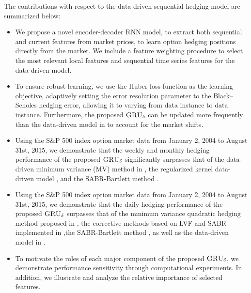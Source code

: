 \documentclass[letterpaper,12pt,titlepage,oneside,final]{book}
\numberwithin{equation}{section}
\theoremstyle{definition}
\newcommand{\model}{\textsc{GRU}_\delta}
\begin{document}
The contributions with respect to the data-driven sequential hedging model \cite{knian2019} are summarized below:
\begin{itemize}
	\item  We propose a novel encoder-decoder  RNN model, to extract both sequential and current features from market prices, to learn option hedging positions directly from the market. We include a feature weighting procedure to select the most relevant local features and sequential time series features for the data-driven model.
	\item To ensure robust learning, we use the Huber loss function as the learning objective,  adaptively setting the error resolution parameter to the Black–Scholes hedging error, allowing it to varying from data instance to data instance. Furthermore,    the proposed $\model$ can be updated more frequently than the data-driven model in \cite{knian2017} to account for the market shifts.
	\item Using the S\&P 500 index option market data from January 2, 2004 to  August 31st, 2015, we demonstrate that the weekly and monthly hedging performance of the proposed $\model$ significantly surpasses that
 of the data-driven minimum variance (MV) method in \citep{hulloptimal}, the regularized kernel data-driven model \citep{knian2017}, and the SABR-Bartlett method \cite{bartlett2006hedging}.
	\item Using the S\&P 500 index option market data from January 2, 2004 to  August 31st, 2015, we demonstrate that
	the daily hedging performance of the proposed $\model$ surpasses that of the minimum variance quadratic hedging method  proposed in \cite{hulloptimal}, the corrective methods
	based on LVF and SABR implemented in \cite{hulloptimal},the SABR-Bartlett method \cite{bartlett2006hedging}, as well as the data-driven model in \cite{knian2017}.
	\item To motivate the roles of each major component of the proposed $\model$, we demonstrate performance sensitivity through computational experiments. In addition, we illustrate and analyze the relative importance of selected features.
\end{itemize}
\end{document}
